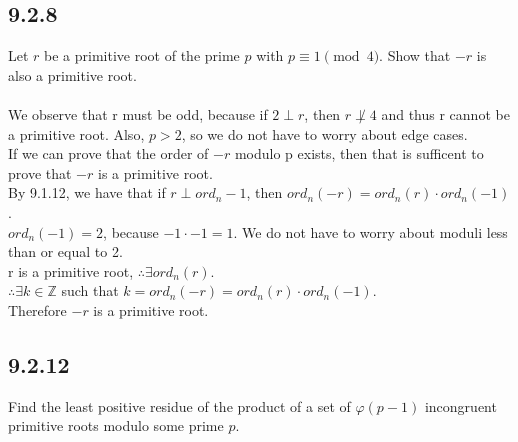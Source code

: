 \documentclass{article}
\begin{document}
\subsection{9.2.8}
Let $r$ be a primitive root of the prime $p$ with $p \equiv 1 \pmod4$.
Show that $-r$ is also a primitive root.
\\
\\We observe that r must be odd, because if $2 \perp r$,
then $r \not\perp 4$ and thus r cannot be a primitive root. Also, $p > 2$, so we do not have to worry about edge cases.
\\If we can prove that the order of $-r$ modulo p exists, then that is sufficent to prove that $-r$ is a primitive root.
\\By 9.1.12, we have that if $r \perp ord_n -1$, then $ord_n(-r) = ord_n(r) \cdot ord_n(-1)$.
\\$ord_n(-1) = 2$, because $-1\cdot-1=1$. We do not have to worry about moduli less than or equal to 2.
\\r is a primitive root, $\therefore \exists ord_n(r)$.
\\$\therefore \exists k \in \mathbb{Z}$ such that $k = ord_n(-r) = ord_n(r) \cdot ord_n(-1)$.
\\Therefore $-r$ is a primitive root.

\subsection{9.2.12}
Find the least positive residue of the product of a set of $\varphi(p-1)$
incongruent primitive roots modulo some prime $p$.
\\

\end{document}
